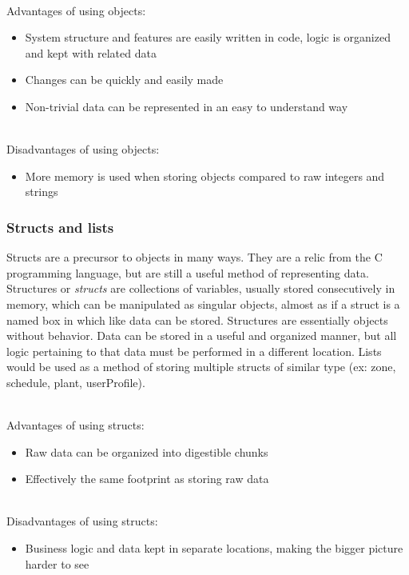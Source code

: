 			\noindent \\Advantages of using objects:
			\begin{itemize}
				\item System structure and features are easily written in code, logic is organized and kept with related data
				\item Changes can be quickly and easily made
				\item Non-trivial data can be represented in an easy to understand way
			\end{itemize}

			\noindent \\Disadvantages of using objects:
			\begin{itemize}
				\item More memory is used when storing objects compared to raw integers and strings
			\end{itemize}


			\subsubsection{Structs and lists}
			Structs are a precursor to objects in many ways. They are a relic from the C programming language, but are still a useful method of representing data.
			Structures or \textit{structs} are collections of variables, usually stored consecutively in memory, which can be manipulated as singular objects, almost as if a struct is a named box in which like data can be stored.
			Structures are essentially objects without behavior. Data can be stored in a useful and organized manner, but all logic pertaining to that data must be performed in a different location.
			Lists would be used as a method of storing multiple structs of similar type (ex: zone, schedule, plant, userProfile).

			\noindent \\Advantages of using structs:
			\begin{itemize}
				\item Raw data can be organized into digestible chunks
				\item Effectively the same footprint as storing raw data
			\end{itemize}

			\noindent \\Disadvantages of using structs:
			\begin{itemize}
				\item Business logic and data kept in separate locations, making the bigger picture harder to see
			\end{itemize}


